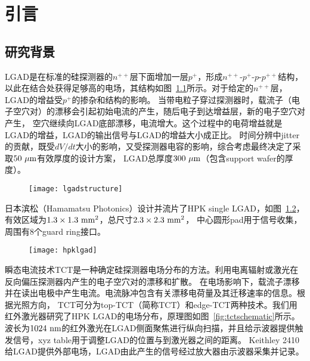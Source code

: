 \chapter{引言}\label{chap:introduction}

\section{研究背景}

LGAD是在标准的硅探测器的$n^{++}$层下面增加一层$p^{+}$，形成$n^{++}$-$p^{+}$-$p$-$p^{++}$结构，
以此在结合处获得足够高的电场，其结构如图~\ref{fig:lgadstructure}所示。对于给定的$n^{++}$层，LGAD的增益受$p^{+}$的掺杂和结构的影响。
当带电粒子穿过探测器时，载流子（电子空穴对）的漂移会引起初始电流的产生，随后电子到达增益层，新的电子空穴对产生，
空穴继续向LGAD底部漂移，电流增大。这个过程中的电荷增益就是LGAD的增益，LGAD的输出信号与LGAD的增益大小成正比。
时间分辨中jitter的贡献，既受$dV/dt$大小的影响，又受探测器电容的影响，综合考虑最终决定了采取$50\ \mu \rm m$有效厚度的设计方案，
LGAD总厚度$300\ \mu \rm m$（包含support wafer的厚度）。

\begin{figure}[!htbp]
    \centering
    \texttt{[image: lgadstructure]}
    \label{fig:lgadstructure}
\end{figure}

日本滨松（Hamamatsu Photonics）设计并流片了HPK single LGAD，如图~\ref{fig:hpklgad}，有效区域为$1.3\times 1.3\rm \ mm^{2}$，总尺寸$2.3\times 2.3\rm \ mm^{2}$，
中心圆形pad用于信号收集，周围有8个guard ring接口。

\begin{figure}[!htbp]
    \centering
    \texttt{[image: hpklgad]}
    \label{fig:hpklgad}
\end{figure}

瞬态电流技术TCT是一种确定硅探测器电场分布的方法。利用电离辐射或激光在反向偏压探测器内产生的电子空穴对的漂移和扩散。
在电场影响下，载流子漂移并在读出电极中产生电流。电流脉冲包含有关漂移电荷量及其迁移速率的信息。根据光照方向，
TCT可分为top-TCT（简称TCT）和edge-TCT两种技术。我们用红外激光器研究了HPK LGAD的电场分布，原理图如图~\ref{fig:tctschematic}所示。
波长为$1024\rm \ nm$的红外激光在LGAD侧面聚焦进行纵向扫描，并且给示波器提供触发信号，xyz table用于调整LGAD的位置与到激光器之间的距离。
Keithley 2410给LGAD提供外部电场，LGAD由此产生的信号经过放大器由示波器采集并记录。

